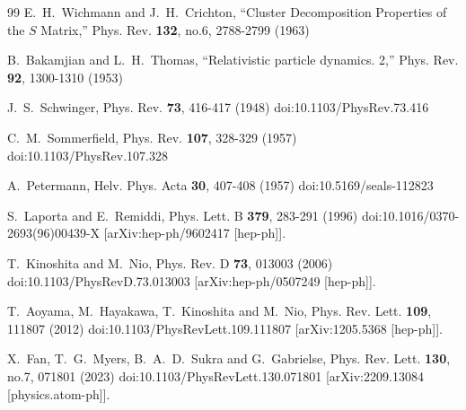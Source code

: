 \documentclass[10pt,a4paper]{jarticle}
\begin{document}
\begin{thebibliography}{99}
E.~H.~Wichmann and J.~H.~Crichton,
``Cluster Decomposition Properties of the $S$ Matrix,''
Phys. Rev. \textbf{132}, no.6, 2788-2799 (1963)

B.~Bakamjian and L.~H.~Thomas,
``Relativistic particle dynamics. 2,''
Phys. Rev. \textbf{92}, 1300-1310 (1953)

J.~S.~Schwinger,
Phys. Rev. \textbf{73}, 416-417 (1948)
doi:10.1103/PhysRev.73.416

C.~M.~Sommerfield,
Phys. Rev. \textbf{107}, 328-329 (1957)
doi:10.1103/PhysRev.107.328

A.~Petermann,
Helv. Phys. Acta \textbf{30}, 407-408 (1957)
doi:10.5169/seals-112823

S.~Laporta and E.~Remiddi,
Phys. Lett. B \textbf{379}, 283-291 (1996)
doi:10.1016/0370-2693(96)00439-X
[arXiv:hep-ph/9602417 [hep-ph]].

T.~Kinoshita and M.~Nio,
Phys. Rev. D \textbf{73}, 013003 (2006)
doi:10.1103/PhysRevD.73.013003
[arXiv:hep-ph/0507249 [hep-ph]].

T.~Aoyama, M.~Hayakawa, T.~Kinoshita and M.~Nio,
Phys. Rev. Lett. \textbf{109}, 111807 (2012)
doi:10.1103/PhysRevLett.109.111807
[arXiv:1205.5368 [hep-ph]].

X.~Fan, T.~G.~Myers, B.~A.~D.~Sukra and G.~Gabrielse,
Phys. Rev. Lett. \textbf{130}, no.7, 071801 (2023)
doi:10.1103/PhysRevLett.130.071801
[arXiv:2209.13084 [physics.atom-ph]].


\end{thebibliography}
\end{document}
